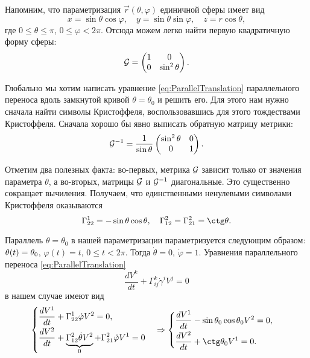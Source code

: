 \begin{solution}
	Напомним, что параметризация $\vec{r}(\theta, \varphi)$ единичной сферы имеет вид
	\[
		x = \sin\theta\cos\varphi,\quad y = \sin\theta\sin\varphi,\quad z = r\cos\theta,
	\]
	где $0 \leqslant \theta \leqslant \pi$, $0 \leqslant \varphi < 2\pi$. Отсюда можем легко найти первую квадратичную форму сферы:
	\[
		\mathcal{G} =
		\begin{pmatrix}
			1 & 0\\
			0 & \sin^2\theta
		\end{pmatrix}.
	\]

	Глобально мы хотим написать уравнение \eqref{eq:ParallelTranslation} параллельного переноса вдоль замкнутой кривой $\theta = \theta_0$ и решить его. Для этого нам нужно сначала найти символы Кристоффеля, воспользовавшись для этого тождествами Кристоффеля. Сначала хорошо бы явно выписать обратную матрицу метрики:
	\[
		\mathcal{G}^{-1} = \frac{1}{\sin\theta}
		\begin{pmatrix}
			\sin^2\theta & 0\\
			0 & 1
		\end{pmatrix}.
	\]

	Отметим два полезных факта: во-первых, метрика $\mathcal{G}$ зависит только от значения параметра $\theta$, а во-вторых, матрицы $\mathcal{G}$ и $\mathcal{G}^{-1}$ диагональные. Это существенно сокращает вычиления. Получаем, что единственными ненулевыми символами Кристоффеля оказываются
	\[
		\Gamma_{22}^1 = -\sin\theta\cos\theta,\quad \Gamma_{12}^2 = \Gamma_{21}^2 = \ctg\theta.
	\]

	Параллель $\theta = \theta_0$ в нашей параметризации параметризуется следующим образом: $\theta(t) \hm= \theta_0$, $\varphi(t) = t$, $0 \leqslant t < 2\pi$. Тогда $\dot{\theta} = 0$, $\dot{\varphi} = 1$. Уравнения параллельного переноса \eqref{eq:ParallelTranslation}
	\[
		\frac{dV^k}{dt} + \Gamma_{ij}^k\dot{\gamma}^iV^j = 0
	\]
	в нашем случае имеют вид
	\[
		\begin{cases}
			\begin{aligned}
				&\frac{dV^1}{dt} + \Gamma_{22}^1\dot{\varphi}V^2 = 0,\\
				&\frac{dV^2}{dt} + \underbrace{\Gamma_{12}^2\dot{\theta}V^2}_{0} + \Gamma_{21}^2\dot{\varphi}V^1 = 0
			\end{aligned}
		\end{cases} \Rightarrow
		\begin{cases}
			\begin{aligned}
				&\frac{dV^1}{dt} - \sin\theta_0\cos\theta_0V^2 = 0,\\
				&\frac{dV^2}{dt} + \ctg\theta_0V^1 = 0.
			\end{aligned}
		\end{cases}
	\]


\end{solution}
